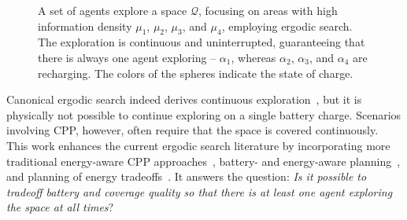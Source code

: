 \documentclass[letterpaper,10pt,conference,twoside]{IEEEtran}
\theoremstyle{definition}
\begin{document}
\begin{figure}[t!]
  \centering
\vspace*{.3cm} 
  \hspace*{-.08cm}
  \caption{A set of agents explore a space $\mathcal{Q}$, focusing on areas with high information density $\mu_1$, $\mu_2$, $\mu_3$, and $\mu_4$, employing ergodic search. The exploration is continuous and uninterrupted, guaranteeing that there is always one agent exploring -- $\alpha_1$, whereas $\alpha_2$, $\alpha_3$, and $\alpha_4$ are recharging. The colors of the spheres indicate the state of charge.}
  \label{fig:abs}
  \vspace*{-.5cm}
\end{figure}

Canonical ergodic search indeed derives continuous exploration~\cite{%
miller2013trajectory,miller2016ergodic,abraham2017ergodic}, but it is physically not possible to continue exploring on a single battery charge. 
Scenarios involving CPP, however, often require that the space is covered continuously.
This work enhances the current ergodic search literature by incorporating more traditional energy-aware CPP approaches~\cite{difranco2015energy,difranco2016coverage,shnaps2016online,cabreira2018energy,wei2018coverage,jensen2021near}, battery- and energy-aware planning~\cite{mei2004energy,mei2005case,kim2005energy,seewald2022energy}, and planning of energy tradeoffs~\cite{ondruska2015scheduled,sudhakar2020balancing}. It answers the question: \textit{Is it possible to tradeoff battery and coverage quality so that there is at least one agent exploring the space at all times}?

\end{document}
